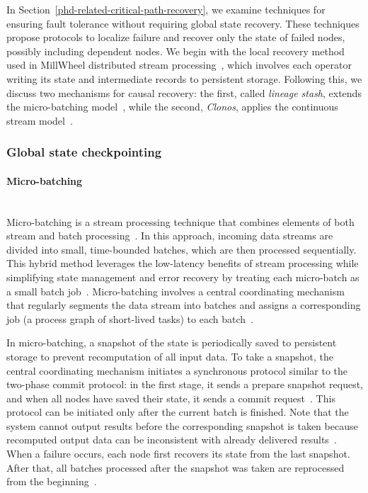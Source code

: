 In Section~\ref{phd-related-critical-path-recovery}, we examine techniques for ensuring fault tolerance without requiring global state recovery. These techniques propose protocols to localize failure and recover only the state of failed nodes, possibly including dependent nodes. We begin with the local recovery method used in MillWheel distributed stream processing~\cite{Akidau:2013:MFS:2536222.2536229}, which involves each operator writing its state and intermediate records to persistent storage. Following this, we discuss two mechanisms for causal recovery: the first, called {\em lineage stash}, extends the micro-batching model~\cite{Wang:2019:LSF:3341301.3359653}, while the second, {\em Clonos}, applies the continuous stream model~\cite{silvestre2021clonos}.

\subsubsection{Global state checkpointing}
\label{phd-related-global-state-checkpointing}

\paragraph{Micro-batching} \mbox{} \\

Micro-batching is a stream processing technique that combines elements of both stream and batch processing~\cite{Zaharia:2012:DSE:2342763.2342773, zaharia2010spark}. In this approach, incoming data streams are divided into small, time-bounded batches, which are then processed sequentially. This hybrid method leverages the low-latency benefits of stream processing while simplifying state management and error recovery by treating each micro-batch as a small batch job~\cite{garcia2023micro}. Micro-batching involves a central coordinating mechanism that regularly segments the data stream into batches and assigns a corresponding job (a process graph of short-lived tasks) to each batch~\cite{Zaharia:2012:DSE:2342763.2342773}.

In micro-batching, a snapshot of the state is periodically saved to persistent storage to prevent recomputation of all input data. To take a snapshot, the central coordinating mechanism initiates a synchronous protocol similar to the two-phase commit protocol: in the first stage, it sends a prepare snapshot request, and when all nodes have saved their state, it sends a commit request~\cite{carbone2018scalable}. This protocol can be initiated only after the current batch is finished. Note that the system cannot output results before the corresponding snapshot is taken because recomputed output data can be inconsistent with already delivered results~\cite{carbone2018scalable, thepaper}. When a failure occurs, each node first recovers its state from the last snapshot. After that, all batches processed after the snapshot was taken are reprocessed from the beginning~\cite{Zaharia:2012:DSE:2342763.2342773}.

